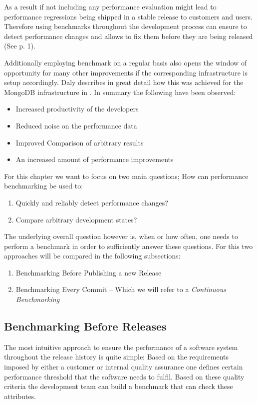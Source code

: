 \documentclass[	runningheads,
				a4paper]{llncs}
\begin{document}
	As a result if not including any performance evaluation might lead to performance regressions being shipped in a stable release to customers and users. Therefore using benchmarks throughout the development process can ensure to detect performance changes and allows to fix them before they are being released (See \cite{daly2021} p. 1). 

	Additionally employing benchmark on a regular basis also opens the window of opportunity for many other improvements if the corresponding infrastructure is setup accordingly. Daly describes in great detail how this was achieved for the MongoDB infrastructure in \cite{daly2021}. In summary the following have been observed:
	\begin{itemize}
		\item Increased productivity of the developers
		\item Reduced noise on the performance data
		\item Improved Comparison of arbitrary results
		\item An increased amount of performance improvements
	\end{itemize}

	For this chapter we want to focus on two main questions; How can performance benchmarking be used to:
	\begin{enumerate}
		\item Quickly and reliably detect performance changes?
		\item Compare arbitrary development states?
	\end{enumerate}

	The underlying overall question however is, when or how often, one needs to perform a benchmark in order to sufficiently answer these questions. For this two approaches will be compared in the following subsections:
	\begin{enumerate}
		\item Benchmarking Before Publishing a new Release
		\item Benchmarking Every Commit -- Which we will refer to a \textit{Continuous Benchmarking}
	\end{enumerate}

	\subsection{Benchmarking Before Releases}
	\label{ssec:bench_rel}
	The most intuitive approach to ensure the performance of a software system throughout the release history is quite simple: Based on the requirements imposed by either a customer or internal quality assurance one defines certain performance threshold that the software needs to fulfil. Based on these quality criteria the development team can build a benchmark that can check these attributes.
\end{document}
